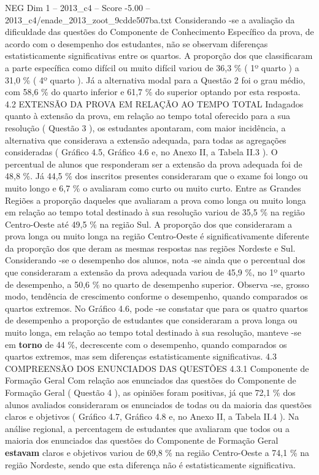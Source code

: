 \begin{textsample}{NEG Dim 1 – 2013\_c4 – Score -5.00 – 2013\_c4/enade\_2013\_zoot\_9cdde507ba.txt}
Considerando -se a avaliação da dificuldade das questões do Componente de Conhecimento Específico da prova, de acordo com o desempenho dos estudantes, não se observam diferenças estatisticamente significativas entre os quartos.
A proporção dos que classificaram a parte específica como difícil ou muito difícil variou de 36,3 \% ( 1º quarto ) a 31,0 \% ( 4º quarto ).
Já a alternativa modal para a Questão 2 foi o grau médio, com 58,6 \% do quarto inferior e 61,7 \% do superior optando por esta resposta. 4.2 EXTENSÃO DA PROVA EM RELAÇÃO AO TEMPO TOTAL Indagados quanto à extensão da prova, em relação ao tempo total oferecido para a sua resolução ( Questão 3 ), os estudantes apontaram, com maior incidência, a alternativa que considerava a extensão adequada, para todas as agregações consideradas ( Gráfico 4.5, Gráfico 4.6 e, no Anexo II, a Tabela II.3 ).
O percentual de alunos que responderam ser a extensão da prova adequada foi de 48,8 \%.
Já 44,5 \% dos inscritos presentes consideraram que o exame foi longo ou muito longo e 6,7 \% o avaliaram como curto ou muito curto.
Entre as Grandes Regiões a proporção daqueles que avaliaram a prova como longa ou muito longa em relação ao tempo total destinado à sua resolução variou de 35,5 \% na região Centro-Oeste até 49,5 \% na região Sul.
A proporção dos que consideraram a prova longa ou muito longa na região Centro-Oeste é significativamente diferente da proporção dos que deram as mesmas respostas nas regiões Nordeste e Sul.
Considerando -se o desempenho dos alunos, nota -se ainda que o percentual dos que consideraram a extensão da prova adequada variou de 45,9 \%, no 1º quarto de desempenho, a 50,6 \% no quarto de desempenho superior.
Observa -se, grosso modo, tendência de crescimento conforme o desempenho, quando comparados os quartos extremos.
No Gráfico 4.6, pode -se constatar que para os quatro quartos de desempenho a proporção de estudantes que consideraram a prova longa ou muito longa, em relação ao tempo total destinado à sua resolução, manteve -se em \textbf{torno} de 44 \%, decrescente com o desempenho, quando comparados os quartos extremos, mas sem diferenças estatisticamente significativas. 4.3 COMPREENSÃO DOS ENUNCIADOS DAS QUESTÕES 4.3.1 Componente de Formação Geral Com relação aos enunciados das questões do Componente de Formação Geral ( Questão 4 ), as opiniões foram positivas, já que 72,1 \% dos alunos avaliados consideraram os enunciados de todas ou da maioria das questões claros e objetivos ( Gráfico 4.7, Gráfico 4.8 e, no Anexo II, a Tabela II.4 ).
Na análise regional, a percentagem de estudantes que avaliaram que todos ou a maioria dos enunciados das questões do Componente de Formação Geral \textbf{estavam} claros e objetivos variou de 69,8 \% na região Centro-Oeste a 74,1 \% na região Nordeste, sendo que esta diferença não é estatisticamente significativa.

\end{textsample}
